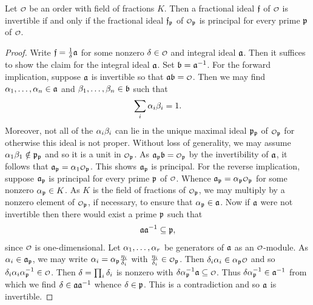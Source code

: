     \begin{proposition}\label{prop:invertible_fractional_ideal_using_localization}
      Let \(\smc{O}\) be an order with field of fractions \(K\). Then a fractional ideal \(\mathfrak{f}\) of \(\smc{O}\) is invertible if and only if the fractional ideal \(\mathfrak{f}_{\mathfrak{p}}\) of \(\smc{O}_{\mf{p}}\) is principal for every prime \(\mathfrak{p}\) of \(\smc{O}\).
    \end{proposition}
    \begin{proof}
      Write \(\mathfrak{f} = \frac{1}{\delta}\mathfrak{a}\) for some nonzero \(\d \in \smc{O}\) and integral ideal \(\mathfrak{a}\). Then it suffices to show the claim for the integral ideal \(\mathfrak{a}\). Set \(\mathfrak{b} = \mathfrak{a}^{-1}\). For the forward implication, suppose \(\mathfrak{a}\) is invertible so that \(\mf{a}\mf{b} = \smc{O}\). Then we may find \(\alpha_{1},\ldots,\alpha_{n} \in \mathfrak{a}\) and \(\beta_{1},\ldots,\beta_{n} \in \mathfrak{b}\) such that
      \[
        \sum_{i}\alpha_{i}\beta_{i} = 1.
      \]
      Moreover, not all of the \(\alpha_{i}\beta_{i}\) can lie in the unique maximal ideal \(\mathfrak{p}_{\mathfrak{p}}\) of \(\smc{O}_{\mf{p}}\) for otherwise this ideal is not proper. Without loss of generality, we may assume \(\alpha_{1}\beta_{1} \notin \mathfrak{p}_{\mathfrak{p}}\) and so it is a unit in \(\smc{O}_{\mf{p}}\). As \(\mf{a}_{\mf{p}}\mf{b} = \smc{O}_{\mf{p}}\) by the invertibility of \(\mathfrak{a}\), it follows that \(\mf{a}_{\mf{p}} = \a_{1}\smc{O}_{\mf{p}}\). This shows \(\mathfrak{a}_{\mathfrak{p}}\) is principal. For the reverse implication, suppose \(\mathfrak{a}_{\mathfrak{p}}\) is principal for every prime \(\mathfrak{p}\) of \(\smc{O}\). Whence \(\mf{a}_{\mf{p}} = \a_{\mf{p}}\smc{O}_{\mf{p}}\) for some nonzero \(\alpha_{\mathfrak{p}} \in K\). As \(K\) is the field of fractions of \(\smc{O}_{\mf{p}}\), we may multiply by a nonzero element of \(\smc{O}_{\mf{p}}\), if necessary, to ensure that \(\alpha_{\mathfrak{p}} \in \mathfrak{a}\). Now if \(\mathfrak{a}\) were not invertible then there would exist a prime \(\mathfrak{p}\) such that
      \[
        \mathfrak{a}\mathfrak{a}^{-1} \subseteq \mathfrak{p},
      \]
      since \(\smc{O}\) is one-dimensional. Let \(\alpha_{1},\ldots,\alpha_{r}\) be generators of \(\mathfrak{a}\) as an \(\smc{O}\)-module. As \(\alpha_{i} \in \mathfrak{a}_{\mathfrak{p}}\), we may write \(\alpha_{i} = \alpha_{\mathfrak{p}}\frac{\eta_{i}}{\delta_{i}}\) with \(\frac{\eta_{i}}{\d_{i}} \in \smc{O}_{\mf{p}}\). Then \(\d_{i}\a_{i} \in \a_{\mf{p}}\smc{O}\) and so \(\d_{i}\a_{i}\a_{\mf{p}}^{-1} \in \smc{O}\). Then \(\delta = \prod_{i}\delta_{i}\) is nonzero with \(\d\a_{\mf{p}}^{-1}\mf{a} \subseteq \smc{O}\). Thus \(\delta\alpha_{\mathfrak{p}}^{-1} \in \mathfrak{a}^{-1}\) from which we find \(\delta \in \mathfrak{a}\mathfrak{a}^{-1}\) whence \(\delta \in \mathfrak{p}\). This is a contradiction and so \(\mathfrak{a}\) is invertible.
    \end{proof}

